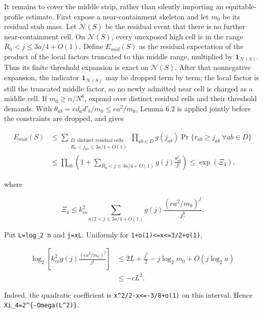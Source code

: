 \documentclass[
  11pt,
  a4paper,
]{article}
\begin{document}
It remains to cover the middle strip, rather than silently importing an
equitable-profile estimate. First expose a near-containment skeleton and
let \(m_0\) be its residual stub mass. Let \(\mathcal N(S)\) be the
residual event that there is no further near-containment cell. On
\(\mathcal N(S)\), every unexposed high cell is in the range
\(R_0<j\le3a/4+O(1)\). Define \(E_{mid}(S)\) as the residual expectation
of the product of the local factors truncated to this middle range,
multiplied by \(\mathbf 1_{\mathcal N(S)}\). Thus its finite threshold
expansion is exact on \(\mathcal N(S)\). After that nonnegative
expansion, the indicator \(\mathbf 1_{\mathcal N(S)}\) may be dropped
term by term; the local factor is still the truncated middle factor, so
no newly admitted near cell is charged as a middle cell. If
\(m_0\ge n/N^6\), expand over distinct residual cells and their
threshold demands. With \(\theta_{ab}=e d_ad'_b/m_0\le ea^2/m_0\), Lemma
6.2 is applied jointly before the constraints are dropped, and gives

\[
\begin{split}
 E_{mid}(S)
 &\le\sum_{\substack{D\ \text{ distinct residual cells}\\
               R_0<j_{ab}\le3a/4+O(1)}}
       \prod_{ab\in D}g(j_{ab})
       \Pr\{r_{ab}\ge j_{ab}\ \forall ab\in D\}\\
 &\le\prod_{ab}\left(1+
       \sum_{R_0<j\le3a/4+O(1)}
       g(j)\frac{\theta_{ab}^j}{j!}\right)
 \le\exp(\Xi_4),                                        \end{split}
\tag{8.26a}
\]

where

\[
 \Xi_4\le k_{co}^2
 \sum_{a/2<j\le3a/4+O(1)}
  g(j)\frac{(ea^2/m_0)^j}{j!}.                           \tag{8.27}
\]

Put \texttt{L=log\_2\ n} and \texttt{j=xL}. Uniformly for
\texttt{1+}\allowbreak{}\texttt{o(1)}\allowbreak{}\texttt{\textless{}}\allowbreak{}\texttt{=}\allowbreak{}\texttt{x\textless{}}\allowbreak{}\texttt{=}\allowbreak{}\texttt{3/}\allowbreak{}\texttt{2+}\allowbreak{}\texttt{o(1)},

\[
\begin{split}
 \log_2\left[k_{co}^2g(j)\frac{(ea^2/m_0)^j}{j!}\right]
 &\le2L+\frac{j^2}{2}-j\log_2m_0+O(j\log_2a)\\
 &\le-cL^2.                                              \end{split}
\tag{8.28}
\]

Indeed, the quadratic coefficient is
\texttt{x\^{}2/}\allowbreak{}\texttt{2-x\textless{}}\allowbreak{}\texttt{=}\allowbreak{}\texttt{-3/}\allowbreak{}\texttt{8+}\allowbreak{}\texttt{o(1)}
on this interval. Hence
\texttt{Xi\_}\allowbreak{}\texttt{4=}\allowbreak{}\texttt{2\^{}\{-Omega(L\^{}2)}\allowbreak{}\texttt{\}}.
\end{document}
